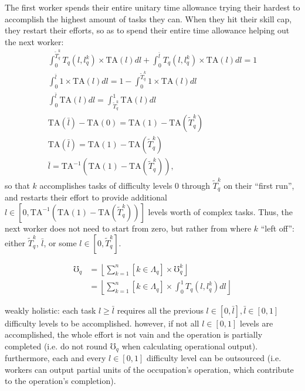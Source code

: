 \documentclass[hidelinks, nonatbib]{elsarticle}
\begin{document}
The first worker spends their entire unitary time allowance trying their hardest to accomplish the highest amount of tasks they can. When they hit their skill cap, they restart their efforts, so as to spend their entire time allowance helping out the next worker:
\begin{gather*}
    \int_{0}^{\tilde{T}_{q}^{k}}{
        T_{q}(l,l_{q}^{k})
        \times
        \text{TA}(l)
        dl
    }
    +
    \int_{0}^{\bar{l}}{
        T_{q}(l,l_{q}^{k})
        \times
        \text{TA}(l)
        dl
    }
    = 1
    \\
    \int_{0}^{\bar{l}}{
        1
        \times
        \text{TA}(l)
        dl
    }
    = 1 -
    \int_{0}^{\tilde{T}_{q}^{k}}{
        1
        \times
        \text{TA}(l)
        dl
    }
    \\
    \int_{0}^{\bar{l}}{
        \text{TA}(l)
        dl
    }
    = 
    \int_{\tilde{T}_{q}^{k}}^{1}{
        \text{TA}(l)
        dl
    }
    \\
    \text{TA}(\bar{l}) -
    \text{TA}(0)
    = 
    \text{TA}(1) -
    \text{TA}(\tilde{T}_{q}^{k})
    \\
    \text{TA}(\bar{l})
    = 
    \text{TA}(1) -
    \text{TA}(\tilde{T}_{q}^{k})
    \\
    \bar{l}
    = 
    \text{TA}^{-1}
    \left(
        \text{TA}(1) -
        \text{TA}(\tilde{T}_{q}^{k})
    \right)
    ,
\end{gather*}
so that $k$ accomplishes tasks of difficulty levels $0$ through $\tilde{T}_{q}^{k}$ on their ``first run'', and restarts their effort to provide additional $l \in \left[0,\text{TA}^{-1}
\left(
    \text{TA}(1) -
    \text{TA}(\tilde{T}_{q}^{k})
\right)
\right]$ levels worth of complex tasks. Thus, the next worker does not need to start from zero, but rather from where $k$ ``left off'': either $\tilde{T}_{q}^{k}$, $\bar{l}$, or some $l \in [0, \tilde{T}_{q}^{k}]$.
        
\begin{align*}
    \mho_q 
    &= 
    \left\lfloor
    \sum_{k=1}^{n}{
        [k \in \Lambda_q]
        \times
        \mho_{q}^{k}
    }
    \right\rfloor
    \\
    &= 
    \left\lfloor
    \sum_{k=1}^{n}{
        [k \in \Lambda_q]
        \times
        \int_{0}^{1}{
            T_{q}(l,l_{q}^{k})
            dl
        }
    }
    \right\rfloor
\end{align*}

weakly holistic: each task $l \geq \bar{l}$ requires all the previous $l \in [0, \bar{l}], \bar{l} \in [0,1]$ difficulty levels to be accomplished. however, if not all $l \in [0,1]$ levels are accomplished, the whole effort is not vain and the operation is partially completed (i.e. do not round $\mho_q$ when calculating operational output). furthermore, each and every $l \in [0,1]$ difficulty level can be outsourced (i.e. workers can output partial units of the occupation's operation, which contribute to the operation's completion).
\end{document}
